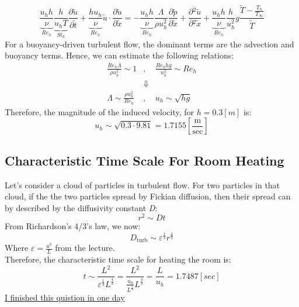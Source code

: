 \documentclass[11pt, a4paper]{article}
\newcommand{\parder}[2]{\frac{\partial {#1}}{\partial {#2}}}
\begin{document}
\begin{equation}
    \underbrace{\frac{u_h h}{\nu}}_\text{$Re_h$}\underbrace{\frac{h}{u_h T}}_\text{$St_h$}\parder{\tilde{u}}{\tilde{t}}+\underbrace{\frac{h u_h}{\nu}}_\text{$Re_h$}\tilde{u}\cdot\parder{\tilde{u}}{\tilde{x}}=-\underbrace{\frac{u_h h}{\nu}}_\text{$Re_h$}\frac{\Lambda}{\rho u_h^2}\parder{\tilde{p}}{\tilde{x}}+\parder{^2\tilde{u}}{^2\tilde{x}}+\underbrace{\frac{u_h h}{\nu}}_\text{$Re_h$}\frac{h}{u_h^2}g\frac{\tilde{T}-\displaystyle\frac{T_h}{T_\infty}}{\tilde{T}}
\end{equation}
For a buoyancy-driven turbulent flow, the dominant terms are the advection and buoyancy terms. Hence, we can estimate the following relations:
\begin{equation}
    \begin{matrix}
        \displaystyle\frac{Re_h\Lambda}{\rho u_h^2}\sim1 &,& \displaystyle\frac{Re_h hg}{u_h^2}\sim Re_h \\
        &\Downarrow& \\
        \displaystyle\Lambda\sim\frac{\rho u_h^2}{Re_h} &,& \displaystyle u_h\sim\sqrt{hg}
    \end{matrix}
\end{equation}
Therefore, the magnitude of the induced velocity, for $h=0.3[m]$ is:
\begin{equation}
    u_h\sim\sqrt{0.3\cdot9.81}=1.7155\left[\frac{\mathrm{m}}{\mathrm{sec}}\right]
\end{equation}

\subsection{Characteristic Time Scale For Room Heating}
Let's consider a cloud of particles in turbulent flow. For two particles in that cloud, if the the two particles spread by Fickian diffusion, then their spread can by described by the diffusivity constant \emph{D}:
\begin{equation}
    r^2\sim Dt
\end{equation}
From Richardson's 4/3's law, we now:
\begin{equation}
    D_\text{turb}\sim\varepsilon^{\frac{1}{3}}r^{\frac{4}{3}}
\end{equation}
Where $\displaystyle\varepsilon=\frac{u^3}{L}$ from the lecture.\\
Therefore, the characteristic time scale for heating the room is:
\begin{equation}
    t\sim\frac{L^2}{\varepsilon^{\frac{1}{3}}L^{\frac{4}{3}}}=\frac{L^2}{\displaystyle\frac{u_h}{L^{\frac{1}{3}}}L^{\frac{4}{3}}}=\frac{L}{u_h}=1.7487[sec]
\end{equation}
\underline{I finished this quistion in one day}
\end{document}
